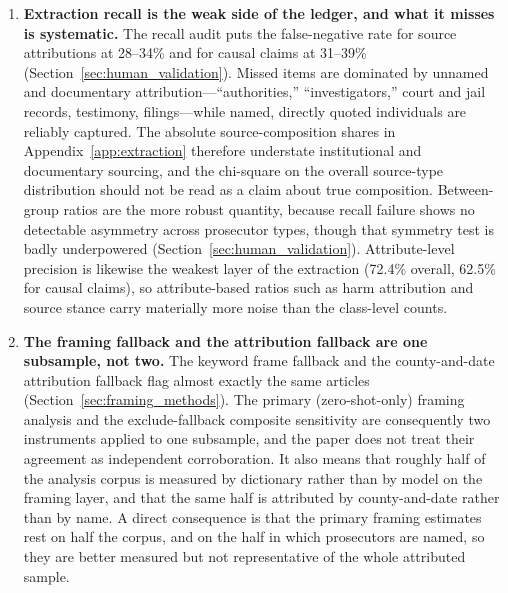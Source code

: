 \documentclass[12pt, letterpaper]{article}
\begin{document}
\begin{enumerate}[leftmargin=*, itemsep=6pt]
\item \textbf{Extraction recall is the weak side of the ledger, and what it misses is systematic.} The recall audit puts the false-negative rate for source attributions at 28--34\% and for causal claims at 31--39\% (Section~\ref{sec:human_validation}). Missed items are dominated by unnamed and documentary attribution---``authorities,'' ``investigators,'' court and jail records, testimony, filings---while named, directly quoted individuals are reliably captured. The absolute source-composition shares in Appendix~\ref{app:extraction} therefore understate institutional and documentary sourcing, and the chi-square on the overall source-type distribution should not be read as a claim about true composition. Between-group ratios are the more robust quantity, because recall failure shows no detectable asymmetry across prosecutor types, though that symmetry test is badly underpowered (Section~\ref{sec:human_validation}). Attribute-level precision is likewise the weakest layer of the extraction (72.4\% overall, 62.5\% for causal claims), so attribute-based ratios such as harm attribution and source stance carry materially more noise than the class-level counts.

\item \textbf{The framing fallback and the attribution fallback are one subsample, not two.} The keyword frame fallback and the county-and-date attribution fallback flag almost exactly the same articles (Section~\ref{sec:framing_methods}). The primary (zero-shot-only) framing analysis and the exclude-fallback composite sensitivity are consequently two instruments applied to one subsample, and the paper does not treat their agreement as independent corroboration. It also means that roughly half of the analysis corpus is measured by dictionary rather than by model on the framing layer, and that the same half is attributed by county-and-date rather than by name. A direct consequence is that the primary framing estimates rest on half the corpus, and on the half in which prosecutors are named, so they are better measured but not representative of the whole attributed sample.


\end{enumerate}
\end{document}

